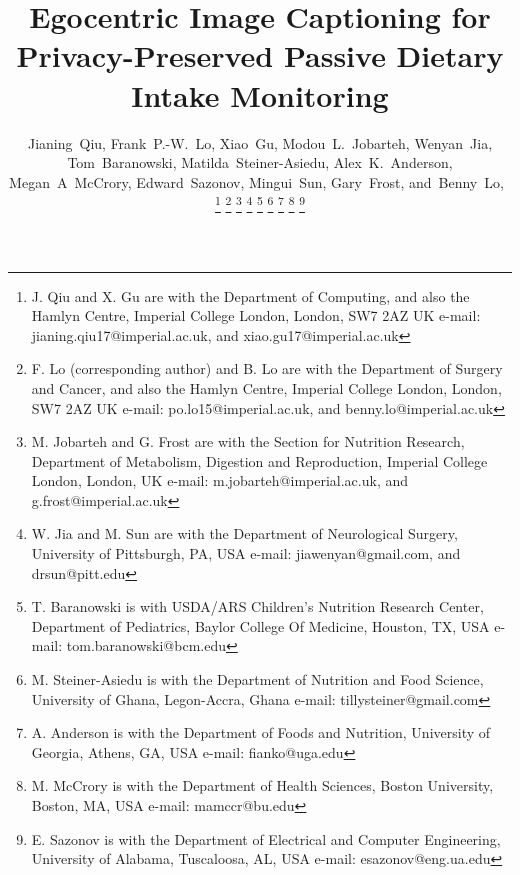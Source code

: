 \documentclass[journal]{IEEEtran}
\begin{document}
%
\title{Egocentric Image Captioning for Privacy-Preserved Passive Dietary Intake Monitoring}
%
%
%

\author{Jianing~Qiu,
        Frank~P.-W.~Lo,
        Xiao~Gu,
        Modou~L.~Jobarteh,
        Wenyan~Jia,
        Tom~Baranowski,
        Matilda~Steiner-Asiedu,
        Alex~K.~Anderson,
        Megan~A~McCrory,
        Edward~Sazonov,
        Mingui~Sun,
        Gary~Frost,
        and~Benny~Lo,~%
\thanks{J. Qiu and X. Gu are with the Department
of Computing, and also the Hamlyn Centre, Imperial College London, London,
SW7 2AZ UK e-mail: jianing.qiu17@imperial.ac.uk, and xiao.gu17@imperial.ac.uk}%
\thanks{F. Lo (corresponding author) and B. Lo are with the Department of Surgery and Cancer, and also the Hamlyn Centre, Imperial College London, London, SW7 2AZ UK e-mail: po.lo15@imperial.ac.uk, and benny.lo@imperial.ac.uk}%
\thanks{M. Jobarteh and G. Frost are with the Section for Nutrition Research, Department of Metabolism, Digestion and Reproduction, Imperial College London, London, UK e-mail: m.jobarteh@imperial.ac.uk, and g.frost@imperial.ac.uk}
\thanks{W. Jia and M. Sun are with the Department of Neurological Surgery, University of Pittsburgh, PA, USA e-mail: jiawenyan@gmail.com, and drsun@pitt.edu}
\thanks{T. Baranowski is with USDA/ARS Children's Nutrition Research Center, Department of Pediatrics, Baylor College Of Medicine, Houston, TX, USA e-mail: tom.baranowski@bcm.edu}
\thanks{M. Steiner-Asiedu is with the Department of Nutrition and Food Science, University of Ghana, Legon-Accra, Ghana e-mail: tillysteiner@gmail.com}
\thanks{A. Anderson is with the Department of Foods and Nutrition, University of Georgia, Athens, GA, USA e-mail: fianko@uga.edu}
\thanks{M. McCrory is with the Department of Health Sciences, Boston University, Boston, MA, USA e-mail: mamccr@bu.edu}
\thanks{E. Sazonov is with the Department of Electrical and Computer Engineering, University of Alabama, Tuscaloosa, AL, USA e-mail: esazonov@eng.ua.edu}
}
\end{document}
